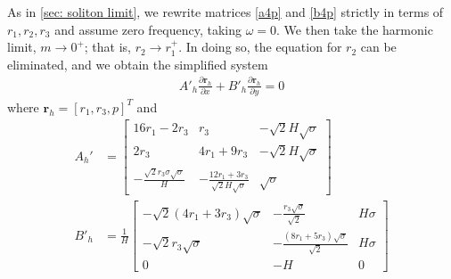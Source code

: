 \documentclass[12pt]{article}
\numberwithin{equation}{section}
\begin{document}
As in \ref{sec: soliton limit}, we rewrite matrices \ref{a4p} and \ref{b4p} strictly in terms of $r_1,r_2,r_3$ and assume zero frequency, taking $\omega=0$. We then take the harmonic limit, $m\to 0^+$; that is, $r_2 \to r_1^+$. In doing so, the equation for $r_2$ can be eliminated, and we obtain the simplified system
\begin{align}
    A'_h\frac{\partial \textbf{r}_h}{\partial x} + B'_h \frac{\partial \textbf{r}_h}{\partial y} = 0 \label{harmpde}
\end{align} 
where $\textbf{r}_h = [r_1,r_3,p]^T$ and
\begin{subequations}
   \begin{align}
    A_h' &= \left[\begin{array}{ccc}
       16r_1-2r_3  &  r_3 & -\sqrt{2}H\sqrt{\sigma}\\
        2r_3 & 4r_1+9r_3 & -\sqrt{2}H\sqrt{\sigma} \\
        -\frac{\sqrt{2}r_3\sigma\sqrt{\sigma}}{H} & -\frac{12r_1+3r_3}{\sqrt{2}H\sqrt{\sigma}} & \sqrt{\sigma}
    \end{array}\right] \\
    B'_h &= \frac{1}{H}\left[\begin{array}{ccc}
        -\sqrt{2}(4r_1+3r_3)\sqrt{\sigma} & -\frac{r_3\sqrt{\sigma}}{\sqrt{2}} & H\sigma \\
        -\sqrt{2}r_3\sqrt{\sigma} & -\frac{(8r_1+5r_3)\sqrt{\sigma}}{\sqrt{2}} & H\sigma \\
        0 & -H & 0
    \end{array}\right]
\end{align}
\end{subequations}
\end{document}
